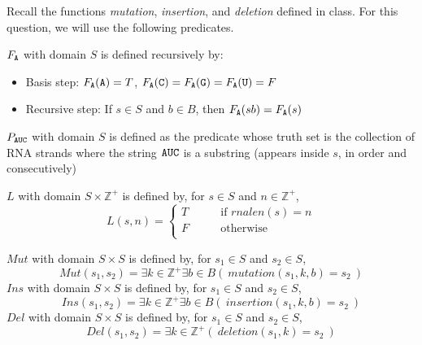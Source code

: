 
Recall the functions \textit{mutation}, \textit{insertion}, and \textit{deletion} defined in class.
For this question, we will use the following predicates.

$F_{\texttt{A}}$ with domain $S$ is defined recursively by: 
\begin{itemize}
\item[]Basis step: $F_{\texttt{A}}(\texttt{A}) = T$, $F_{\texttt{A}}(\texttt{C}) = F_{\texttt{A}}(\texttt{G}) = F_{\texttt{A}}(\texttt{U}) = F$
\item[]Recursive step: If $s \in S$ and $b \in B$, then $F_{\texttt{A}}(sb) = F_{\texttt{A}}(s)$
\end{itemize}

$P_{\texttt{A}\texttt{U}\texttt{C}}$ with domain $S$ is defined as the predicate whose truth set
is the collection of RNA strands where the string $\texttt{A}\texttt{U}\texttt{C}$
is a substring (appears inside $s$, in order and consecutively)

$L$ with domain $S \times \mathbb{Z}^+$ is defined by, for $s \in S$ and $n \in \mathbb{Z}^+$,
\[
L( s, n) = \begin{cases}
T &\qquad\text{if $rnalen(s) = n$}\\
F &\qquad\text{otherwise}\\
\end{cases}
\]

$Mut$ with domain $S \times S$ is defined by, for $s_1 \in S$ and $s_2 \in S$,
\[
Mut(s_1,s_2) = \exists k\in \mathbb{Z^+} \exists b \in B (~ mutation(s_1, k, b) = s_2~)
\]
$Ins$ with domain $S \times S$ is defined by, for $s_1 \in S$ and $s_2 \in S$,
\[
Ins(s_1,s_2) = \exists k\in \mathbb{Z^+} \exists b \in B (~ insertion(s_1, k, b) = s_2~)
\]
$Del$ with domain $S \times S$ is defined by, for $s_1 \in S$ and $s_2 \in S$,
\[
Del(s_1,s_2) = \exists k\in \mathbb{Z^+} (~ deletion(s_1, k) = s_2~)
\]

